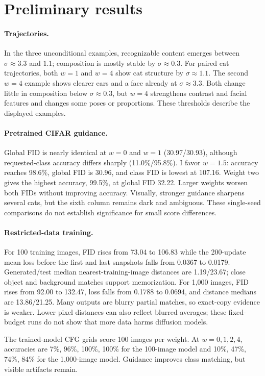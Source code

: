 \documentclass[11pt]{article}
\begin{document}
\section{Preliminary results}
\paragraph{Trajectories.}
In the three unconditional examples, recognizable content emerges between $\sigma\approx3.3$ and $1.1$; composition is mostly stable by $\sigma\approx0.3$. For paired cat trajectories, both $w=1$ and $w=4$ show cat structure by $\sigma\approx1.1$. The second $w=4$ example shows clearer ears and a face already at $\sigma\approx3.3$. Both change little in composition below $\sigma\approx0.3$, but $w=4$ strengthens contrast and facial features and changes some poses or proportions. These thresholds describe the displayed examples.

\paragraph{Pretrained CIFAR guidance.}
Global FID is nearly identical at $w=0$ and $w=1$ (30.97/30.93), although requested-class accuracy differs sharply (11.0\%/95.8\%). I favor $w=1.5$: accuracy reaches 98.6\%, global FID is 30.96, and class FID is lowest at 107.16. Weight two gives the highest accuracy, 99.5\%, at global FID 32.22. Larger weights worsen both FIDs without improving accuracy. Visually, stronger guidance sharpens several cats, but the sixth column remains dark and ambiguous. These single-seed comparisons do not establish significance for small score differences.

\paragraph{Restricted-data training.}
For 100 training images, FID rises from 73.04 to 106.83 while the 200-update mean loss before the first and last snapshots falls from 0.0367 to 0.0179. Generated/test median nearest-training-image distances are 1.19/23.67; close object and background matches support memorization. For 1,000 images, FID rises from 92.00 to 132.47, loss falls from 0.1788 to 0.0694, and distance medians are 13.86/21.25. Many outputs are blurry partial matches, so exact-copy evidence is weaker. Lower pixel distances can also reflect blurred averages; these fixed-budget runs do not show that more data harms diffusion models.

The trained-model CFG grids score 100 images per weight. At $w=0,1,2,4$, accuracies are 7\%, 96\%, 100\%, 100\% for the 100-image model and 10\%, 47\%, 74\%, 84\% for the 1,000-image model. Guidance improves class matching, but visible artifacts remain.
\end{document}
